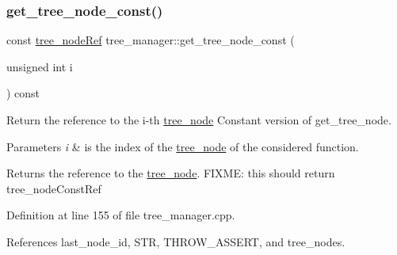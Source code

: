 \subsubsection{\texorpdfstring{get\+\_\+tree\+\_\+node\+\_\+const()}{get\_tree\_node\_const()}}
{\footnotesize\ttfamily const \hyperlink{tree__node_8hpp_a6ee377554d1c4871ad66a337eaa67fd5}{tree\+\_\+node\+Ref} tree\+\_\+manager\+::get\+\_\+tree\+\_\+node\+\_\+const (\begin{DoxyParamCaption}\item[{unsigned int}]{i }\end{DoxyParamCaption}) const}



Return the reference to the i-\/th \hyperlink{classtree__node}{tree\+\_\+node} Constant version of get\+\_\+tree\+\_\+node. 


\begin{DoxyParams}{Parameters}
{\em i} & is the index of the \hyperlink{classtree__node}{tree\+\_\+node} of the considered function. \\
\hline
\end{DoxyParams}
\begin{DoxyReturn}{Returns}
the reference to the \hyperlink{classtree__node}{tree\+\_\+node}. F\+I\+X\+ME\+: this should return tree\+\_\+node\+Const\+Ref 
\end{DoxyReturn}


Definition at line 155 of file tree\+\_\+manager.\+cpp.



References last\+\_\+node\+\_\+id, S\+TR, T\+H\+R\+O\+W\+\_\+\+A\+S\+S\+E\+RT, and tree\+\_\+nodes.



